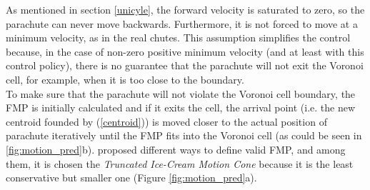 As mentioned in section \ref{unicyle}, the forward velocity is saturated to zero, so the parachute can never move backwards. Furthermore, it is not forced to move at a minimum velocity, as in the real chutes. This assumption simplifies the control because, in the case of non-zero positive minimum velocity (and at least with this control policy), there is no guarantee that the parachute will not exit the Voronoi cell, for example, when it is too close to the boundary.\\
To make sure that the parachute will not violate the Voronoi cell boundary, the FMP is initially calculated and if it exits the cell, the arrival point (i.e. the new centroid founded by (\ref{centroid})) is moved closer to the actual position of parachute iteratively until the FMP fits into the Voronoi cell (as could be seen in \autoref{fig:motion_pred}b). \cite{b4} proposed different ways to define valid FMP, and among them, it is chosen the \textit{Truncated Ice-Cream Motion Cone} because it is the least conservative but smaller one (Figure \ref{fig:motion_pred}a).